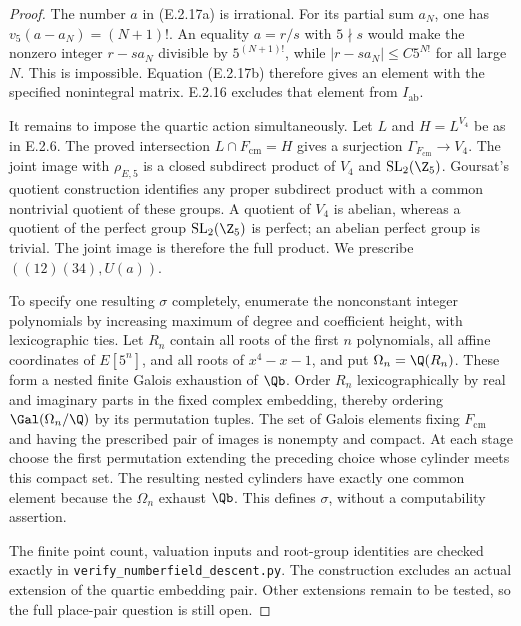 \begin{proof}
The number \(a\) in (E.2.17a) is irrational. For its partial
sum \(a_N\), one has \(v_5(a-a_N)=(N+1)!\).
An equality \(a=r/s\) with \(5\nmid s\) would make the
nonzero integer \(r-sa_N\) divisible by \(5^{(N+1)!}\),
while \(|r-sa_N|\le C5^{N!}\) for all large \(N\).
This is impossible.
Equation (E.2.17b) therefore gives an element with the
specified nonintegral matrix. E.2.16 excludes that element
from \(I_{\mathrm{ab}}\).

It remains to impose the quartic action simultaneously.
Let \(L\) and \(H=L^{V_4}\) be as in E.2.6.
The proved intersection \(L\cap F_{\mathrm{cm}}=H\)
gives a surjection \(\Gamma_{F_{\mathrm{cm}}}\to V_4\).
The joint image with \(\rho_{E,5}\) is a closed subdirect
product of \(V_4\) and \(\mathrm{SL}_2(\Z_5)\).
Goursat's quotient construction identifies any proper
subdirect product with a common nontrivial quotient of
these groups. A quotient of \(V_4\) is abelian, whereas
a quotient of the perfect group
\(\mathrm{SL}_2(\Z_5)\) is perfect; an abelian perfect
group is trivial. The joint image is therefore the full
product. We prescribe \(((12)(34),U(a))\).

To specify one resulting \(\sigma\) completely, enumerate
the nonconstant integer polynomials by increasing maximum
of degree and coefficient height, with lexicographic ties.
Let \(R_n\) contain all roots of the first \(n\) polynomials,
all affine coordinates of \(E[5^n]\), and all roots of
\(x^4-x-1\), and put \(\Omega_n=\Q(R_n)\).
These form a nested finite Galois exhaustion of \(\Qb\).
Order \(R_n\) lexicographically by real and imaginary parts
in the fixed complex embedding, thereby ordering
\(\Gal(\Omega_n/\Q)\) by its permutation tuples.
The set of Galois elements fixing \(F_{\mathrm{cm}}\)
and having the prescribed pair of images is nonempty
and compact. At each stage choose the first permutation
extending the preceding choice whose cylinder meets this
compact set. The resulting nested cylinders have exactly
one common element because the \(\Omega_n\) exhaust
\(\Qb\). This defines \(\sigma\), without a computability
assertion.

The finite point count, valuation inputs and root-group
identities are checked exactly in
\texttt{verify\_numberfield\_descent.py}.
The construction excludes an actual extension of the
quartic embedding pair. Other extensions remain to be
tested, so the full place-pair question is still open.
\end{proof}

